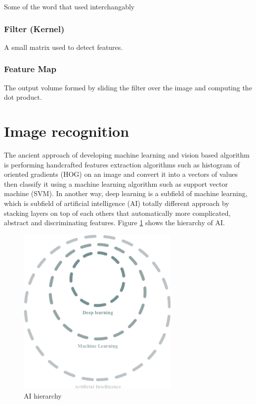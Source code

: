 \documentclass[12pt]{report}
\begin{document}
    Some of the word that used interchangably
\subsubsection{Filter (Kernel)}
    A small matrix used to detect features.
\subsubsection{Feature Map}
    The output volume formed by sliding the filter over the image and computing the dot product.

\section{Image recognition}

    The ancient approach of developing machine learning and vision based algorithm
    is performing handcrafted features extraction algorithms such as histogram of oriented gradients (HOG) on an image
    and convert it into a vectors of values then classify it using a machine learning algorithm such as support vector machine (SVM).
    In another way, deep learning is a subfield of machine learning, which is subfield of artificial intelligence (AI)
    totally different approach by stacking layers on top of each others that automatically more complicated, abstract 
    and discriminating features. Figure \ref{fig:ai_hierarchy} shows the hierarchy of AI.
\bigbreak
\bigbreak
\begin{figure}[h]
    \centering
    \includegraphics[width=0.7\textwidth]{./images/ai_ml_dl.png}
    \caption{AI hierarchy}
    \label{fig:ai_hierarchy}
\end{figure} 
\end{document}
